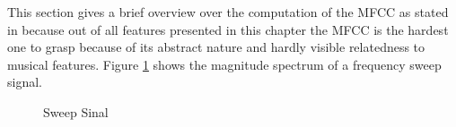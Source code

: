 This section gives a brief overview over the computation of the MFCC as stated in \cite[pp. 55ff]{knees1} because out of all features presented in this chapter the MFCC is the hardest one to grasp because of its abstract nature and hardly visible relatedness to musical features.
Figure \ref{sweep} shows the magnitude spectrum of a frequency sweep signal.
\begin{figure}[htbp]
	\centering
	\caption{Sweep Sinal}	
	\label{sweep}
\end{figure}
